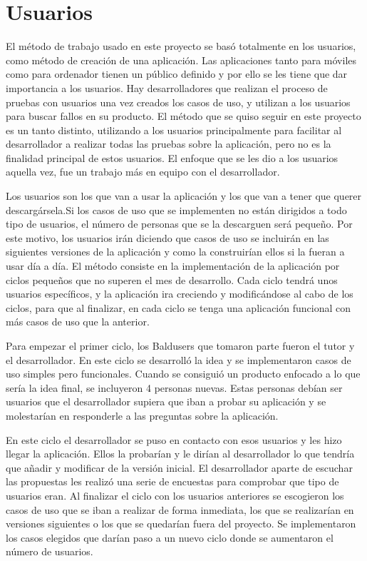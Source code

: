\chapter{Usuarios}
\label{ch:Usuarios}



El método de trabajo usado en este proyecto se basó totalmente en los usuarios, como método de creación de una aplicación. Las aplicaciones tanto para móviles como para ordenador tienen un público definido y por ello se les tiene que dar importancia a los usuarios.
Hay desarrolladores que realizan el proceso de pruebas con usuarios una vez creados los casos de uso, y utilizan a los usuarios para buscar fallos en su producto. El método que se quiso seguir en este proyecto  es un tanto distinto, utilizando a los usuarios principalmente para facilitar al desarrollador a realizar todas las pruebas sobre la aplicación, pero no es la finalidad principal de estos usuarios. El enfoque que se les dio a los usuarios aquella vez, fue un trabajo más en equipo con el desarrollador.

Los usuarios son los que van a usar la aplicación y los que van a tener que querer descargársela.Si los casos de uso que se implementen no están dirigidos a todo tipo de usuarios, el número de personas que se la descarguen será pequeño.
Por este motivo, los usuarios irán diciendo que casos de uso se incluirán en las siguientes versiones de la aplicación y como la construirían ellos si la fueran a usar día a día.
El método consiste en la implementación de la aplicación por ciclos pequeños que no superen el mes de desarrollo.
Cada ciclo tendrá unos usuarios específicos, y la aplicación ira creciendo y modificándose al cabo de los ciclos, para que al finalizar, en cada ciclo se tenga una aplicación funcional con más casos de uso que la anterior.

Para empezar el primer ciclo, los Baldusers que tomaron parte fueron el tutor y el desarrollador.
En este ciclo se desarrolló la idea y se implementaron casos de uso simples pero funcionales.
Cuando se consiguió un producto enfocado a lo que sería la idea final, se incluyeron 4 personas nuevas. Estas personas debían ser usuarios que el desarrollador supiera que iban a probar su aplicación y se molestarían en responderle a las preguntas sobre la aplicación. 

En este ciclo el desarrollador se puso en contacto con esos usuarios y les hizo llegar la aplicación. Ellos la probarían y le dirían al desarrollador lo que tendría que añadir y modificar de la versión inicial. El desarrollador aparte de escuchar las propuestas les realizó una serie de encuestas para comprobar que tipo de usuarios eran.
Al finalizar el ciclo con los usuarios anteriores se escogieron los casos de uso que se iban a realizar de forma inmediata, los que se realizarían en versiones siguientes o los que se quedarían fuera del proyecto.
Se implementaron los casos elegidos que darían paso a un nuevo ciclo donde se aumentaron el número de usuarios.

